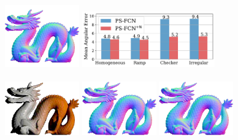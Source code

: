 \includegraphics[width=0.24\textwidth]{ch-psfcn/images/Results/Synth_Test/SVBRDF/dragon_normal_4.0_resize.png}
\includegraphics[width=0.43\textwidth]{ch-psfcn/images/Results/Synth_Test/SVBRDF/normal_barchart.pdf}
\\
\vspace{-0.7em}
\\
 \vspace{0.2em}
\includegraphics[width=0.24\textwidth]{ch-psfcn/images/Results/Synth_Test/SVBRDF/1_75_0_2.0_4.0.png}\hspace{-0.3em}
\includegraphics[width=0.24\textwidth]{ch-psfcn/images/Results/Synth_Test/SVBRDF/PS-FCN_75_4_4.0.png}\hspace{-0.3em}
\includegraphics[width=0.24\textwidth]{ch-psfcn/images/Results/Synth_Test/SVBRDF/1_75_4_4.0.png}
\vspace{-6.5em}
\\
\makebox[0.24\textwidth]{\footnotesize \hfill } 
